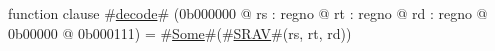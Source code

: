 function clause #\hyperref[zdecode]{decode}# (0b000000 @ rs : regno @ rt : regno @ rd : regno @ 0b00000 @ 0b000111) =
  #\hyperref[zSome]{Some}#(#\hyperref[zSRAV]{SRAV}#(rs, rt, rd))
